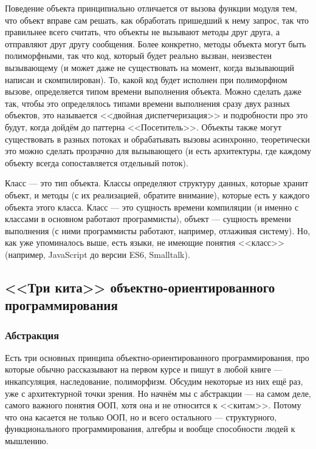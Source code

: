 \documentclass{../../text-style}
\begin{document}
Поведение объекта принципиально отличается от вызова функции модуля тем, что объект вправе сам решать, как обработать пришедший к нему запрос, так что правильнее всего считать, что объекты не вызывают методы друг друга, а отправляют друг другу сообщения. Более конкретно, методы объекта могут быть полиморфными, так что код, который будет реально вызван, неизвестен вызывающему (и может даже не существовать на момент, когда вызывающий написан и скомпилирован). То, какой код будет исполнен при полиморфном вызове, определяется типом времени выполнения объекта. Можно сделать даже так, чтобы это определялось типами времени выполнения сразу двух разных объектов, это называется <<двойная диспетчеризация>> и подробности про это будут, когда дойдём до паттерна <<Посетитель>>. Объекты также могут существовать в разных потоках и обрабатывать вызовы асинхронно, теоретически это можно сделать прозрачно для вызывающего (и есть архитектуры, где каждому объекту всегда сопоставляется отдельный поток).

Класс --- это тип объекта. Классы определяют структуру данных, которые хранит объект, и методы (с их реализацией, обратите внимание), которые есть у каждого объекта этого класса. Класс --- это сущность времени компиляции (и именно с классами в основном работают программисты), объект --- сущность времени выполнения (с ними программисты работают, например, отлаживая систему). Но, как уже упоминалось выше, есть языки, не имеющие понятия <<класс>> (например, JavaScript до версии ES6, Smalltalk).

\subsection{<<Три кита>> объектно-ориентированного программирования}

\subsubsection{Абстракция}

Есть три основных принципа объектно-ориентированного программирования, про которые обычно рассказывают на первом курсе и пишут в любой книге --- инкапсуляция, наследование, полиморфизм. Обсудим некоторые из них ещё раз, уже с архитектурной точки зрения. Но начнём мы с абстракции --- на самом деле, самого важного понятия ООП, хотя она и не относится к <<китам>>. Потому что она касается не только ООП, но и всего остального --- структурного, функционального программирования, алгебры и вообще способности людей к мышлению.
\end{document}
